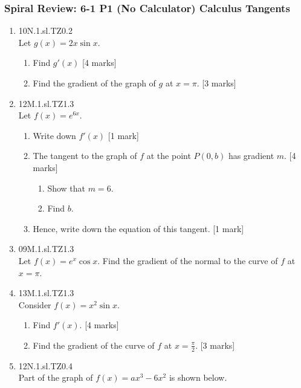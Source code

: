 \documentclass[12pt, twoside]{article}
\begin{document}
\subsubsection*{Spiral Review: 6-1 P1 (No Calculator) Calculus Tangents}
 \begin{enumerate}

  \item 10N.1.sl.TZ0.2\\
  Let $g(x)=2x \sin x$.
  \begin{enumerate}
    \item Find $g'(x)$ [4 marks]
    \item Find the gradient of the graph of $g$ at $x=\pi$. [3 marks]
  \end{enumerate}

  \item 12M.1.sl.TZ1.3\\
  Let $f(x)=e^{6x}$.
  \begin{enumerate}
    \item Write down $f'(x)$ [1 mark]
    \item The tangent to the graph of $f$ at the point $P(0,b)$ has gradient $m$.  [4 marks]
    \begin{enumerate}
      \item Show that $m=6$.
      \item Find $b$.
    \end{enumerate}
    \item Hence, write down the equation of this tangent. [1 mark]
  \end{enumerate}

  \item 09M.1.sl.TZ1.3\\
  Let $f(x)=e^{x} \cos x$. Find the gradient of the normal to the curve of $f$ at $x= \pi$.

  \item 13M.1.sl.TZ1.3\\
  Consider $f(x)=x^2 \sin x$.
  \begin{enumerate}
    \item Find $f'(x)$. [4 marks]
    \item Find the gradient of the curve of $f$ at $x= \frac{\pi}{2}$. [3 marks]
  \end{enumerate}

  \item 12N.1.sl.TZ0.4\\
  Part of the graph of $f(x)= ax^3-6x^2$ is shown below.
  \begin{center}
  \end{center}


\end{enumerate}
\end{document}
